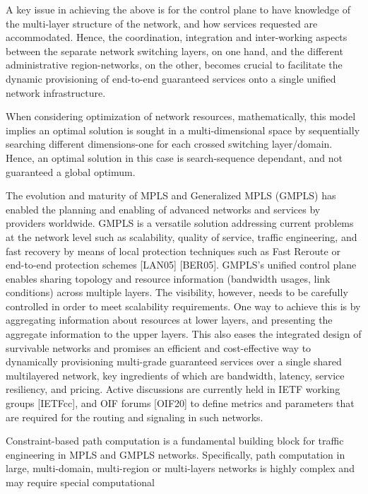 A key issue in achieving the above is for the control plane to have knowledge of the multi-layer structure of the network, and how services requested are accommodated. Hence, the coordination, integration and inter-working aspects between the separate network switching layers, on one hand, and the different administrative region-networks, on the other, becomes crucial to facilitate the dynamic provisioning of end-to-end guaranteed services onto a single unified network infrastructure.

When considering optimization of network resources, mathematically, this model implies an optimal solution is sought in a multi-dimensional space by sequentially searching different dimensions-one for each crossed switching layer/domain. Hence, an optimal solution in this case is search-sequence dependant, and not guaranteed a global optimum.

The evolution and maturity of  \gls{MPLS} and Generalized MPLS (GMPLS) has enabled the planning and enabling of advanced networks and services by providers worldwide. GMPLS is a versatile solution addressing current problems at the network level such as scalability, quality of service, traffic engineering, and fast recovery by means of local protection techniques such as Fast Reroute or end-to-end protection schemes [LAN05] [BER05]. GMPLS's unified control plane enables sharing topology and resource information (bandwidth usages, link conditions) across multiple layers. The visibility, however, needs to be carefully controlled in order to meet scalability requirements. One way to achieve this is by aggregating information about resources at lower layers, and presenting the aggregate information to the upper layers. This also eases the integrated design of survivable networks and promises an efficient and cost-effective way to dynamically provisioning multi-grade guaranteed services over a single shared multilayered network, key ingredients of which are bandwidth, latency, service resiliency, and pricing. Active discussions are currently held in IETF working groups [IETFcc], and OIF forums [OIF20] to define metrics and parameters that are required for the routing and signaling in such networks.

Constraint-based path computation is a fundamental building block for traffic engineering in  \gls{MPLS} and GMPLS networks. Specifically, path computation in large, multi-domain, multi-region or multi-layers networks is highly complex and may require special computational 

